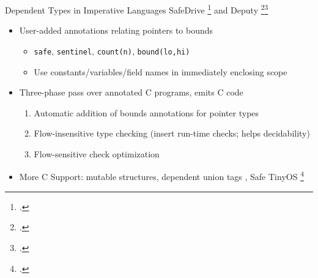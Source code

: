 \documentclass[aspectratio=169]{beamer}
\begin{document}
\begin{frame}{Dependent Types in Imperative Languages}
    SafeDrive \footcite{zhou_safedrive:_2006} and Deputy \footcite{condit_dependent_2007}\footcite{anderson_static_2007}
    \begin{itemize}[<+->]
        \item User-added annotations relating pointers to bounds
            \begin{itemize}
                \item \texttt{safe}, \texttt{sentinel}, \texttt{count(n)}, \texttt{bound(lo,hi)}
                \item Use constants/variables/field names in immediately enclosing scope 
            \end{itemize}
        \item Three-phase pass over annotated C programs, emits C code
            \begin{enumerate}
                \item Automatic addition of bounds annotations for pointer types 
                \item Flow-insensitive type checking (insert run-time checks; helps decidability) 
                \item Flow-sensitive check optimization
            \end{enumerate}
        \item More C Support: mutable structures, dependent union tags , Safe TinyOS \footcite{cooprider_efficient_2007} %
    \end{itemize}
    \vspace{0.2in}
\end{frame}
\end{document}
